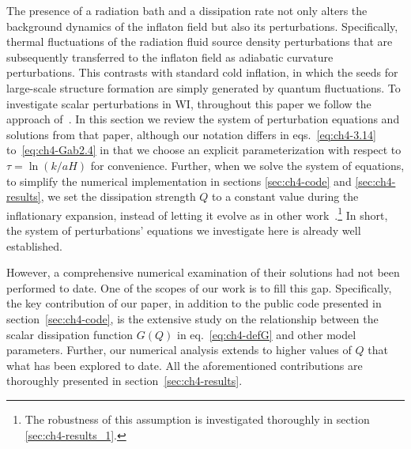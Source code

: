 The presence of a radiation bath and a dissipation rate not only alters the background dynamics of the inflaton field but also its perturbations. Specifically, thermal fluctuations of the radiation fluid source density perturbations that are subsequently transferred to the inflaton field as adiabatic curvature perturbations. This contrasts with standard cold inflation, in which the seeds for large-scale structure formation are simply generated by quantum fluctuations. To investigate scalar perturbations in WI, throughout this paper we follow the approach of~\cite{Ramos:2013nsa}. In this section we review the system of perturbation equations and solutions from that paper, although our notation differs in eqs.~\eqref{eq:ch4-3.14} to~\eqref{eq:ch4-Gab2.4} in that we choose an explicit parameterization with respect to $\tau=\ln(k/aH)$  for convenience.
Further, when we solve the system of equations, to simplify the numerical implementation in sections \ref{sec:ch4-code} and \ref{sec:ch4-results}, we set the dissipation strength $Q$ to a constant value during the inflationary expansion, instead of letting it evolve as in other work~\cite{Ramos:2013nsa}.\footnote{The robustness of this assumption is investigated thoroughly in section \ref{sec:ch4-results_1}.} In short, the system of perturbations' equations we investigate here is already well established. 

However, a comprehensive numerical examination of their solutions had not been performed to date. One of the scopes of our work is to fill this gap. Specifically, the key contribution of our paper, in addition to the public code presented in section~\ref{sec:ch4-code}, is the extensive study on the relationship between the scalar dissipation function $G(Q)$ in eq.~\eqref{eq:ch4-defG} and other model parameters. Further, our numerical analysis extends to higher values of $Q$ that what has been explored to date. All the aforementioned contributions are thoroughly presented in section~\ref{sec:ch4-results}. 

